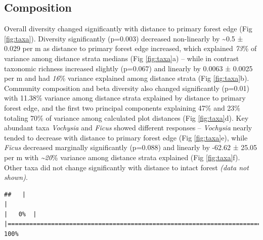 \documentclass[
  12pt,
]{article}
\begin{document}
\hypertarget{composition}{%
\subsection{Composition}\label{composition}}

Overall diversity changed significantly with distance to primary forest edge
(Fig \ref{fig:taxa}).
Diversity significantly
(p=0.003)
decreased non-linearly by
\textasciitilde0.5 ±
0.029 per m
as distance to primary forest edge increased,
which explained
\emph{73}\% of variance
among distance strata medians
(Fig \ref{fig:taxa}a) --
while in contrast taxonomic richness increased slightly
(p=0.067)
and linearly
by
0.0063 ±
0.0025 per m
and had \emph{16}\% variance explained
among distance strata
(Fig \ref{fig:taxa}b).
Community composition and beta diversity also changed significantly
(p=0.01) with
11.38\%
variance among distance strata explained by distance to primary forest edge,
and the first two principal components explaining
47\% and
23\% totaling
70\%
of variance among calculated plot distances
(Fig \ref{fig:taxa}d).
Key abundant taxa \emph{Vochysia} and \emph{Ficus} showed different responses -- \emph{Vochysia} nearly tended to decrease with distance to primary forest edge
(Fig \ref{fig:taxa}e),
while \emph{Ficus} decreased marginally significantly
(p=0.088)
and linearly by
-62.62 ±
25.05 per m
with \emph{\textasciitilde20}\% variance among distance strata explained
(Fig \ref{fig:taxa}f).
Other taxa did not change significantly with distance to intact forest \emph{(data not shown)}.

\begin{verbatim}
##   |                                                                              |                                                                      |   0%  |                                                                              |======================================================================| 100%
\end{verbatim}
\end{document}
